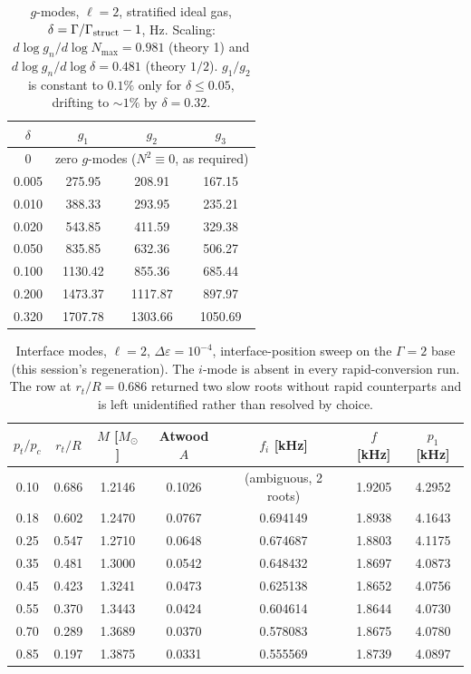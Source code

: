 \documentclass[aps,prd,preprint,amsmath,amssymb,nofootinbib,longbibliography]{revtex4-2}
\newcommand{\Msun}{M_\odot}
\begin{document}
\begin{table}[htbp]
\caption{$g$-modes, $\ell=2$, stratified ideal gas, $\delta = \Gamma/\Gamma_{\rm struct}-1$, Hz.
Scaling: $d\log g_n/d\log N_{\max} = 0.981$ (theory 1) and $d\log g_n/d\log\delta = 0.481$
(theory $1/2$). $g_1/g_2$ is constant to $0.1\%$ only for $\delta\le0.05$, drifting to $\sim1\%$
by $\delta=0.32$.}
\label{tab:g}
\begin{ruledtabular}
\begin{tabular}{cccc}
$\delta$ & $g_1$ & $g_2$ & $g_3$\\
\hline
0 & \multicolumn{3}{c}{zero $g$-modes ($N^2\equiv0$, as required)}\\
0.005 & 275.95 & 208.91 & 167.15\\
0.010 & 388.33 & 293.95 & 235.21\\
0.020 & 543.85 & 411.59 & 329.38\\
0.050 & 835.85 & 632.36 & 506.27\\
0.100 & 1130.42 & 855.36 & 685.44\\
0.200 & 1473.37 & 1117.87 & 897.97\\
0.320 & 1707.78 & 1303.66 & 1050.69\\
\end{tabular}
\end{ruledtabular}
\end{table}

\begin{table}[htbp]
\caption{Interface modes, $\ell=2$, $\Delta\varepsilon = 10^{-4}$, interface-position sweep on
the $\Gamma=2$ base (this session's regeneration). The $i$-mode is absent in every rapid-conversion
run. The row at $r_t/R = 0.686$ returned two slow roots without rapid counterparts and is left
unidentified rather than resolved by choice.}
\label{tab:imode}
\begin{ruledtabular}
\begin{tabular}{ccccccc}
$p_t/p_c$ & $r_t/R$ & $M$ [$\Msun$] & Atwood $A$ & $f_i$ [kHz] & $f$ [kHz] & $p_1$ [kHz]\\
\hline
0.10 & 0.686 & 1.2146 & 0.1026 & (ambiguous, 2 roots) & 1.9205 & 4.2952\\
0.18 & 0.602 & 1.2470 & 0.0767 & 0.694149 & 1.8938 & 4.1643\\
0.25 & 0.547 & 1.2710 & 0.0648 & 0.674687 & 1.8803 & 4.1175\\
0.35 & 0.481 & 1.3000 & 0.0542 & 0.648432 & 1.8697 & 4.0873\\
0.45 & 0.423 & 1.3241 & 0.0473 & 0.625138 & 1.8652 & 4.0756\\
0.55 & 0.370 & 1.3443 & 0.0424 & 0.604614 & 1.8644 & 4.0730\\
0.70 & 0.289 & 1.3689 & 0.0370 & 0.578083 & 1.8675 & 4.0780\\
0.85 & 0.197 & 1.3875 & 0.0331 & 0.555569 & 1.8739 & 4.0897\\
\end{tabular}
\end{ruledtabular}
\end{table}
\end{document}

